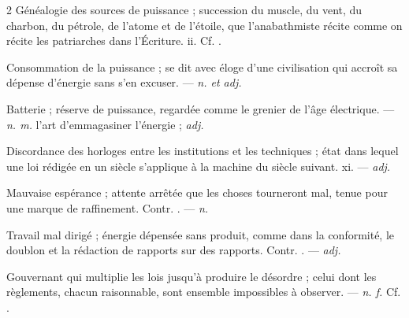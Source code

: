 \begin{multicols}{2}
 Généalogie des sources de puissance ; succession du muscle, du vent, du charbon, du pétrole, de l'atome et de l'étoile, que l'anabathmiste récite comme on récite les patriarches dans l'Écriture.  ii. Cf. .

 Consommation de la puissance ; se dit avec éloge d'une civilisation qui accroît sa dépense d'énergie sans s'en excuser. —  \textit{n. et adj.}

 Batterie ; réserve de puissance, regardée comme le grenier de l'âge électrique.  —  \textit{n. m.} l'art d'emmagasiner l'énergie ;  \textit{adj.}

 Discordance des horloges entre les institutions et les techniques ; état dans lequel une loi rédigée en un siècle s'applique à la machine du siècle suivant.   xi. —  \textit{adj.}

 Mauvaise espérance ; attente arrêtée que les choses tourneront mal, tenue pour une marque de raffinement. Contr. . —  \textit{n.}

 Travail mal dirigé ; énergie dépensée sans produit, comme dans la conformité, le doublon et la rédaction de rapports sur des rapports. Contr. . —  \textit{adj.}

 Gouvernant qui multiplie les lois jusqu'à produire le désordre ; celui dont les règlements, chacun raisonnable, sont ensemble impossibles à observer. —  \textit{n. f.} Cf. .

\end{multicols}

